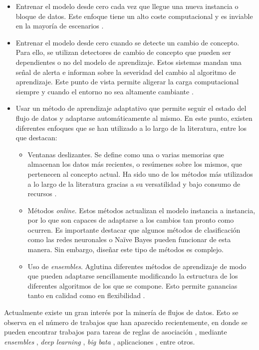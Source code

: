 \documentclass[c5paper,10pt,twoside]{book}	   	%
\begin{document}
\begin{itemize}
	\item Entrenar el modelo desde cero cada vez que llegue una nueva instancia o bloque de datos. Este enfoque tiene un alto coste computacional y es inviable en la mayoría de escenarios \cite{Kj00,Sk01,Zmlr04}.
	
	\item Entrenar el modelo desde cero cuando se detecte un cambio de concepto. Para ello, se utilizan detectores de cambio de concepto que pueden ser dependientes o no del modelo de aprendizaje. Estos sistemas mandan una señal de alerta e informan sobre la severidad del cambio al algoritmo de aprendizaje. Este punto de vista permite aligerar la carga computacional siempre y cuando el entorno no sea altamente cambiante \cite{Gmcr04, Bg07,Pw13,Vm14}.
	
	\item Usar un método de aprendizaje adaptativo que permite seguir el estado del flujo de datos y adaptarse automáticamente al mismo. En este punto, existen diferentes enfoques que se han utilizado a lo largo de la literatura, entre los que destacan:
	
	\begin{itemize}
		\item Ventanas deslizantes. Se define como una o varias memorias que almacenan los datos más recientes, o resúmenes sobre los mismos, que pertenecen al concepto actual. Ha sido uno de los métodos más utilizados a lo largo de la literatura gracias a su versatilidad y bajo consumo de recursos \cite{Wk96,Hsd01, Bbdmw02,Gc06,Ks14,Tran19}. 
		
		\item Métodos \textit{online}. Estos métodos actualizan el modelo instancia a instancia, por lo que son capaces de adaptarse a los cambios tan pronto como ocurren. Es importante destacar que algunos métodos de clasificación como las redes neuronales o Naïve Bayes pueden funcionar de esta manera. Sin embargo, diseñar este tipo de métodos es complejo.
		
		\item Uso de \textit{ensembles}. Aglutina diferentes métodos de aprendizaje de modo que pueden adaptarse sencillamente modificando la estructura de los diferentes algoritmos de los que se compone. Esto permite ganancias tanto en calidad como en flexibilidad \cite{Kmgsw17}.
	\end{itemize}
\end{itemize}

Actualmente existe un gran interés por la minería de flujos de datos. Esto se observa en el número de trabajos que han aparecido recientemente, en donde se pueden encontrar trabajos para tareas de reglas de asociación \cite{Rc18}, mediante \textit{ensembles} \cite{Rlzlll18,soares2018,junior2019}, \textit{deep learning} \cite{Mjsgvr18}, \textit{big bata} \cite{Lsdych17,Fmc18}, aplicaciones \cite{Cstbpgfgd18,Khlm18}, entre otros.
\end{document}
